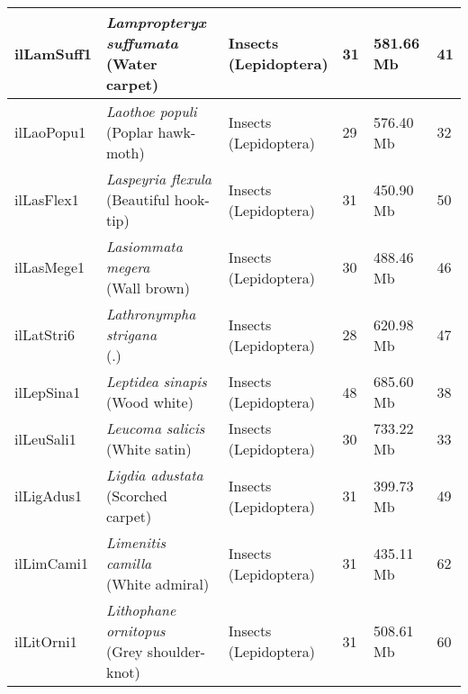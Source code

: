\begin{centering}
\begin{longtable}{l|l|l|l|l|l}
ilLamSuff1 & \makecell[{l}]{\textit{Lampropteryx suffumata} \\ (Water carpet)} & \makecell[{l}]{Insects \\ (Lepidoptera)} & 31 & 581.66 Mb & 41  \\ \hline
ilLaoPopu1 & \makecell[{l}]{\textit{Laothoe populi} \\ (Poplar hawk-moth)} & \makecell[{l}]{Insects \\ (Lepidoptera)} & 29 & 576.40 Mb & 32  \\ \hline
ilLasFlex1 & \makecell[{l}]{\textit{Laspeyria flexula} \\ (Beautiful hook-tip)} & \makecell[{l}]{Insects \\ (Lepidoptera)} & 31 & 450.90 Mb & 50  \\ \hline
ilLasMege1 & \makecell[{l}]{\textit{Lasiommata megera} \\ (Wall brown)} & \makecell[{l}]{Insects \\ (Lepidoptera)} & 30 & 488.46 Mb & 46  \\ \hline
ilLatStri6 & \makecell[{l}]{\textit{Lathronympha strigana} \\ (.)} & \makecell[{l}]{Insects \\ (Lepidoptera)} & 28 & 620.98 Mb & 47  \\ \hline
ilLepSina1 & \makecell[{l}]{\textit{Leptidea sinapis} \\ (Wood white)} & \makecell[{l}]{Insects \\ (Lepidoptera)} & 48 & 685.60 Mb & 38  \\ \hline
ilLeuSali1 & \makecell[{l}]{\textit{Leucoma salicis} \\ (White satin)} & \makecell[{l}]{Insects \\ (Lepidoptera)} & 30 & 733.22 Mb & 33  \\ \hline
ilLigAdus1 & \makecell[{l}]{\textit{Ligdia adustata} \\ (Scorched carpet)} & \makecell[{l}]{Insects \\ (Lepidoptera)} & 31 & 399.73 Mb & 49  \\ \hline
ilLimCami1 & \makecell[{l}]{\textit{Limenitis camilla} \\ (White admiral)} & \makecell[{l}]{Insects \\ (Lepidoptera)} & 31 & 435.11 Mb & 62  \\ \hline
ilLitOrni1 & \makecell[{l}]{\textit{Lithophane ornitopus} \\ (Grey shoulder-knot)} & \makecell[{l}]{Insects \\ (Lepidoptera)} & 31 & 508.61 Mb & 60  \\ \hline

\end{longtable}
\end{centering}
